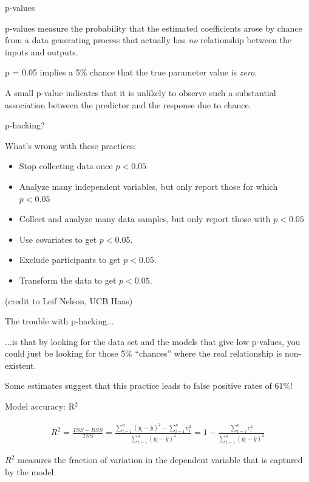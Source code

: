 \documentclass[aspectratio=169]{beamer}
\begin{document}
\begin{frame}{p-values}


p-values measure the probability that the estimated coefficients arose by chance from a data generating process that actually has \textit{no} relationship between the inputs and outputs.  

\vspace{5mm}

p = 0.05 implies a 5\% chance that the true parameter value is \textit{zero}.  

\vspace{5mm}

A small p-value indicates that it is unlikely to observe such a substantial association between the predictor and the response due to chance.

\end{frame}

\begin{frame}{p-hacking?}

What's wrong with these practices:
\begin{itemize}
\item Stop collecting data once $p<0.05$
\item Analyze many independent variables, but only report those for which $p<0.05$
\item Collect and analyze many data samples, but only report those with $p<0.05$
\item  Use covariates to get $p<0.05$.
\item Exclude participants to get  $p<0.05$.
\item Transform the data to get  $p<0.05$.
\end{itemize}

(credit to Leif Nelson, UCB Haas)

\end{frame}

\begin{frame}{The trouble with p-hacking...}

...is that by looking for the data set and the models that give low p-values, you could just be looking for those 5\% ``chances'' where the real relationship is non-existent.

\vspace{5mm}\pause

Some estimates suggest that this practice leads to false positive rates of 61\%!

\end{frame}

\begin{frame}{Model accuracy: R$^2$}

\begin{align*}
R^2 = \frac{TSS - RSS}{TSS} = \frac{\sum_{i=1}^n (y_i-\bar{y})^2 - \sum_{i=1}^n e_i^2}{\sum_{i=1}^n (y_i-\bar{y})^2} = 1-\frac{\sum_{i=1}^n e_i^2}{\sum_{i=1}^n (y_i-\bar{y})^2} 
\end{align*}

\pause
$R^2$ measures the fraction of variation in the dependent variable that is captured by the model.  

\end{frame}
\end{document}
